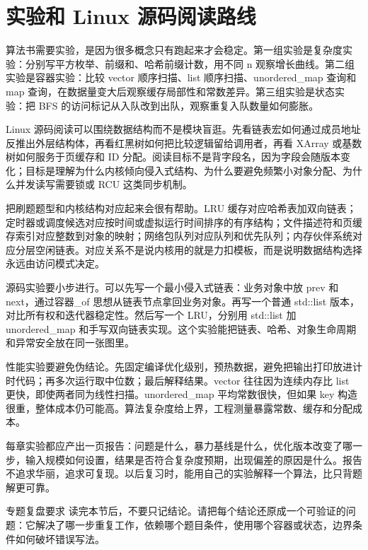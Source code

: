 \section{实验和 Linux 源码阅读路线}

算法书需要实验，是因为很多概念只有跑起来才会稳定。第一组实验是复杂度实验：分别写平方枚举、前缀和、哈希前缀计数，用不同 n 观察增长曲线。第二组实验是容器实验：比较 vector 顺序扫描、list 顺序扫描、unordered\_map 查询和 map 查询，在数据量变大后观察缓存局部性和常数差异。第三组实验是状态实验：把 BFS 的访问标记从入队改到出队，观察重复入队数量如何膨胀。

Linux 源码阅读可以围绕数据结构而不是模块盲逛。先看链表宏如何通过成员地址反推出外层结构体，再看红黑树如何把比较逻辑留给调用者，再看 XArray 或基数树如何服务于页缓存和 ID 分配。阅读目标不是背字段名，因为字段会随版本变化；目标是理解为什么内核倾向侵入式结构、为什么要避免频繁小对象分配、为什么并发读写需要锁或 RCU 这类同步机制。

把刷题题型和内核结构对应起来会很有帮助。LRU 缓存对应哈希表加双向链表；定时器或调度候选对应按时间或虚拟运行时间排序的有序结构；文件描述符和页缓存索引对应整数到对象的映射；网络包队列对应队列和优先队列；内存伙伴系统对应分层空闲链表。对应关系不是说内核用的就是力扣模板，而是说明数据结构选择永远由访问模式决定。

源码实验要小步进行。可以先写一个最小侵入式链表：业务对象中放 prev 和 next，通过容器\_of 思想从链表节点拿回业务对象。再写一个普通 std::list 版本，对比所有权和迭代器稳定性。然后写一个 LRU，分别用 std::list 加 unordered\_map 和手写双向链表实现。这个实验能把链表、哈希、对象生命周期和异常安全放在同一张图里。

性能实验要避免伪结论。先固定编译优化级别，预热数据，避免把输出打印放进计时代码；再多次运行取中位数；最后解释结果。vector 往往因为连续内存比 list 更快，即使两者同为线性扫描。unordered\_map 平均常数很快，但如果 key 构造很重，整体成本仍可能高。算法复杂度给上界，工程测量暴露常数、缓存和分配成本。

每章实验都应产出一页报告：问题是什么，暴力基线是什么，优化版本改变了哪一步，输入规模如何设置，结果是否符合复杂度预期，出现偏差的原因是什么。报告不追求华丽，追求可复现。以后复习时，能用自己的实验解释一个算法，比只背题解更可靠。

\begin{principlebox}{专题复盘要求}
读完本节后，不要只记结论。请把每个结论还原成一个可验证的问题：它解决了哪一步重复工作，依赖哪个题目条件，使用哪个容器或状态，边界条件如何破坏错误写法。
\end{principlebox}
